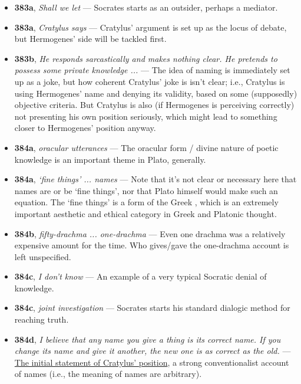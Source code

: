 \documentclass[12pt]{article}
\begin{document}
\begin{itemize}


\item \textbf{383a}, \textit{Shall we let} --- Socrates starts as an outsider, perhaps a mediator.

\item \textbf{383a}, \textit{Cratylus says} --- Cratylus' argument is set up as the locus of debate, but Hermogenes' side will be tackled first.

\item \textbf{383b}, \textit{He responds sarcastically and makes nothing clear. He pretends to possess some private knowledge ...} --- The idea of naming is immediately set up as a joke, but how coherent Cratylus' joke is isn't clear; i.e., Cratylus is using Hermogenes' name and denying its validity, based on some (supposedly) objective criteria. But Cratylus is also (if Hermogenes is perceiving correctly) not presenting his own position seriously, which might lead to something closer to Hermogenes' position anyway.

\item \textbf{384a}, \textit{oracular utterances} --- The oracular form / divine nature of poetic knowledge is an important theme in Plato, generally.

\item \textbf{384a}, \textit{`fine things' ... names} --- Note that it's not clear or necessary here that names are or be `fine things', nor that Plato himself would make such an equation. The `fine things' is a form of the Greek , which is an extremely important aesthetic and ethical category in Greek and Platonic thought.

\item \textbf{384b}, \textit{fifty-drachma ... one-drachma} --- Even one drachma was a relatively expensive amount for the time. Who gives/gave the one-drachma account is left unspecified.

\item \textbf{384c}, \textit{I don't know} --- An example of a very typical Socratic denial of knowledge.

\item \textbf{384c}, \textit{joint investigation} --- Socrates starts his standard dialogic method for reaching truth.

\item \textbf{384d}, \textit{I believe that any name you give a thing is its correct name. If you change its name and give it another, the new one is as correct as the old.} --- \ul{The initial statement of Cratylus' position}, a strong conventionalist account of names (i.e., the meaning of names are arbitrary).


\end{itemize}
\end{document}
